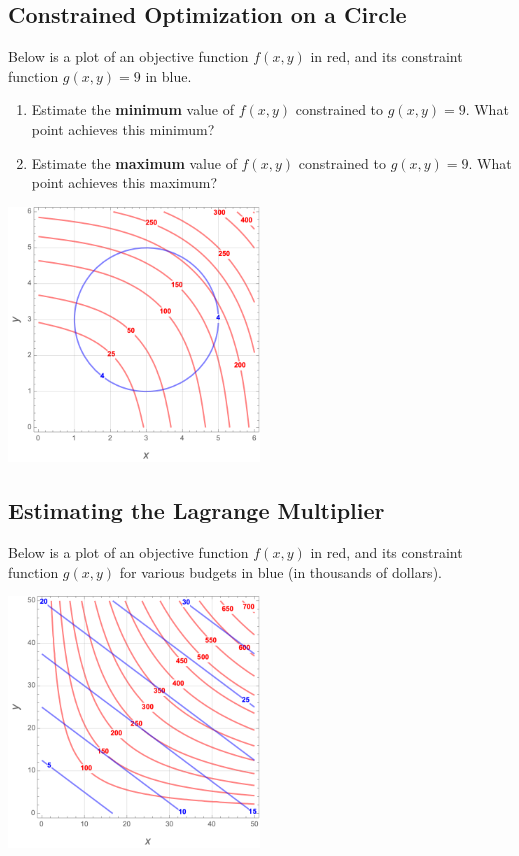 \documentclass[
]{book}
\providecommand{\tightlist}{%
  \setlength{\itemsep}{0pt}\setlength{\parskip}{0pt}}
\begin{document}
\hypertarget{constrained-optimization-on-a-circle}{%
\subsection{Constrained Optimization on a Circle}\label{constrained-optimization-on-a-circle}}

Below is a plot of an objective function \(f(x,y)\) in red, and its constraint function \(g(x,y)=9\) in blue.

\begin{enumerate}
\def\labelenumi{\arabic{enumi}.}
\tightlist
\item
  Estimate the \textbf{minimum} value of \(f(x,y)\) constrained to \(g(x,y)=9\). What point achieves this minimum?
\item
  Estimate the \textbf{maximum} value of \(f(x,y)\) constrained to \(g(x,y)=9\). What point achieves this maximum?
\end{enumerate}

\includegraphics[width=0.5\textwidth,height=\textheight]{images/constrained-circle.png}

\hypertarget{estimating-the-lagrange-multiplier}{%
\subsection{Estimating the Lagrange Multiplier}\label{estimating-the-lagrange-multiplier}}

Below is a plot of an objective function \(f(x,y)\) in red, and its constraint function \(g(x,y)\) for various budgets in blue (in thousands of dollars).

\includegraphics[width=0.5\textwidth,height=\textheight]{images/cobb-douglas2.png}
\end{document}
